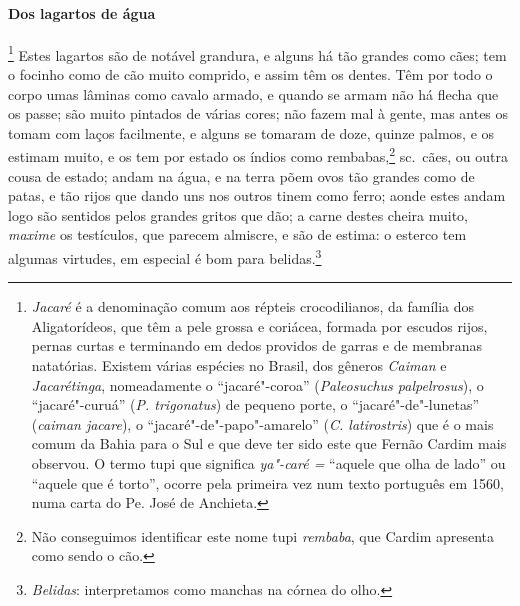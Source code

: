 \begin{linenumbers}
\paragraph{Dos lagartos de água}\quad
{}\footnote{ \textit{Jacaré} é a denominação
comum aos répteis crocodilianos, da família dos Aligatorídeos, que têm
a pele grossa e coriácea, formada por escudos rijos, pernas curtas e
terminando em dedos providos de garras e de membranas natatórias.
Existem várias espécies no Brasil, dos gêneros \textit{Caiman} e 
\textit{Jacarétinga}, nomeadamente o ``jacaré"-coroa''
(\textit{Paleosuchus palpelrosus}), o ``jacaré"-curuá'' (\textit{P.
trigonatus}) de pequeno porte, o ``jacaré"-de"-lunetas'' (\textit{caiman
jacare}), o ``jacaré"-de"-papo"-amarelo'' (\textit{C. latirostris}) que é o
mais comum da Bahia para o Sul e que deve ter sido este que Fernão
Cardim mais observou. O termo tupi que significa \textit{ya"-caré =}
``aquele que olha de lado'' ou ``aquele que é torto'', ocorre pela primeira
vez num texto português em 1560, numa carta do Pe. José de
Anchieta.} Estes lagartos são de notável grandura, e alguns
há tão grandes como cães; tem o focinho como de cão muito comprido, e
assim têm os dentes. Têm por todo o corpo umas lâminas como cavalo
armado, e quando se armam não há flecha que os passe; são muito
pintados de várias cores; não fazem mal à gente, mas antes os tomam com
laços facilmente, e alguns se tomaram de doze, quinze palmos, e os
estimam muito, e os tem por estado os índios como rembabas,\footnote{ Não 
conseguimos identificar este nome tupi \textit{rembaba}, que
Cardim apresenta como sendo o cão.} sc.~cães, ou outra cousa de estado;
andam na água, e na terra põem ovos tão grandes como de patas, e tão
rijos que dando uns nos outros tinem como ferro; aonde estes andam logo
são sentidos pelos grandes gritos que dão; a carne destes cheira muito,
\textit{maxime} os testículos, que parecem almiscre, e são de estima: o esterco
tem algumas virtudes, em especial é bom para belidas.\footnote{ \textit{Belidas}: 
interpretamos como manchas na córnea do olho.} 



\end{linenumbers}
